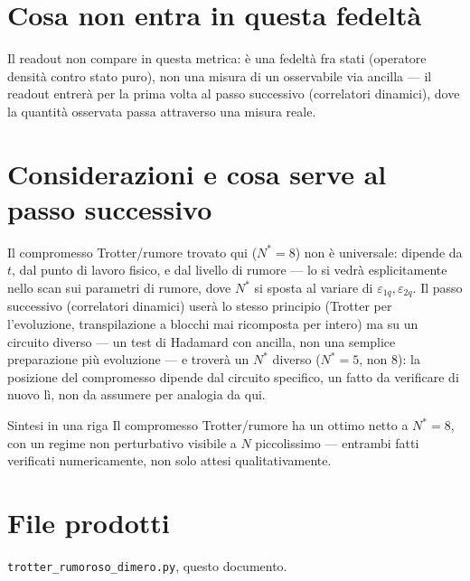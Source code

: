 \documentclass[11pt,a4paper]{article}
\begin{document}
\section{Cosa non entra in questa fedeltà}

Il readout non compare in questa metrica: è una fedeltà fra stati
(operatore densità contro stato puro), non una misura di un osservabile
via ancilla --- il readout entrerà per la prima volta al passo
successivo (correlatori dinamici), dove la quantità osservata passa
attraverso una misura reale.

\section{Considerazioni e cosa serve al passo successivo}

Il compromesso Trotter/rumore trovato qui ($N^*=8$) non è universale:
dipende da $t$, dal punto di lavoro fisico, e dal livello di rumore ---
lo si vedrà esplicitamente nello scan sui parametri di rumore, dove
$N^*$ si sposta al variare di $\varepsilon_{1q},\varepsilon_{2q}$. Il
passo successivo (correlatori dinamici) userà lo stesso principio
(Trotter per l'evoluzione, transpilazione a blocchi mai ricomposta per
intero) ma su un circuito diverso --- un test di Hadamard con ancilla,
non una semplice preparazione più evoluzione --- e troverà un $N^*$
diverso ($N^*=5$, non $8$): la posizione del compromesso dipende dal
circuito specifico, un fatto da verificare di nuovo lì, non da assumere
per analogia da qui.

\begin{okbox}{Sintesi in una riga}
Il compromesso Trotter/rumore ha un ottimo netto a $N^*=8$, con un
regime non perturbativo visibile a $N$ piccolissimo --- entrambi fatti
verificati numericamente, non solo attesi qualitativamente.
\end{okbox}

\section*{File prodotti}

\texttt{trotter\_rumoroso\_dimero.py}, questo documento.
\end{document}
